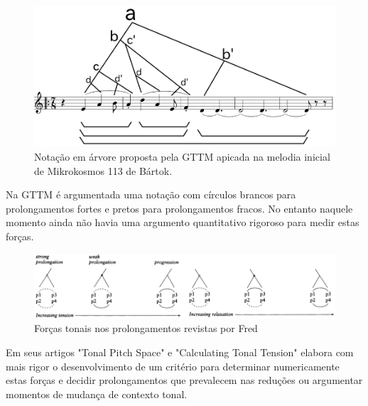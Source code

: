 \documentclass[
	12pt,				%
	openright,			%
	twoside,			%
	a4paper,			%
	english,			%
	french,				%
	spanish,			%
	brazil				%
	]{abntex2}
\begin{document}
\begin{figure}[!h]
	\caption{\label{fig_grafico}Notação em árvore proposta pela GTTM apicada na melodia inicial de Mikrokosmos 113 de Bártok.}
	\begin{center}
	    \includegraphics[scale=0.4]{mikro/mikro113_GTTM_tree.png}
	\end{center}
\end{figure} 

\pagebreak
Na GTTM\cite[pg. 182]{lerdahl1983generative} é argumentada uma notação com círculos brancos para prolongamentos fortes e pretos para prolongamentos fracos. No entanto naquele momento ainda não havia uma argumento quantitativo rigoroso para medir estas forças.

\begin{figure}[!h]
	\caption{\label{fig_grafico}Forças tonais nos prolongamentos revistas por Fred  }
	\begin{center}
	    \includegraphics[scale=0.5]{lerdahl/prolongation_calculating.png}
	\end{center}
\end{figure}


Em seus artigos "Tonal Pitch Space"\cite{lerdahl1988tps} e "Calculating Tonal Tension"\cite{lerdahl1996calculating} elabora com mais rigor o desenvolvimento de um critério para determinar numericamente estas forças e decidir prolongamentos que prevalecem nas reduções ou argumentar momentos de mudança de contexto tonal. 
\end{document}
